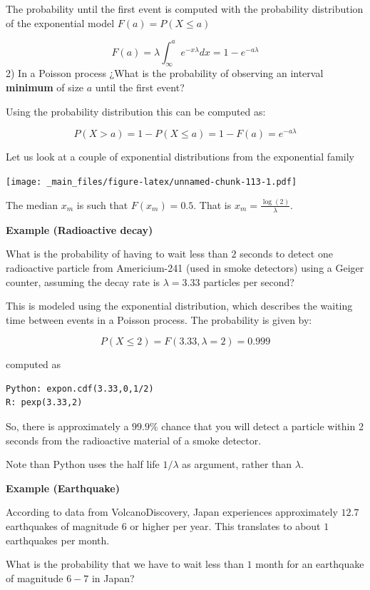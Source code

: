 \documentclass[
]{book}
\begin{document}
The probability until the first event is computed with the probability distribution of the exponential model \(F(a)=P(X \leq a)\)

\[F(a)=\lambda \int_\infty^a e^{-x\lambda}dx=1-e^{-a\lambda}\]
2) In a Poisson process ¿What is the probability of observing an interval \textbf{minimum} of size \(a\) until the first event?

Using the probability distribution this can be computed as:

\[P(X > a)=1- P(X \leq a)= 1- F(a) = e^{-a\lambda}\]

Let us look at a couple of exponential distributions from the exponential family

\texttt{[image: \_main\_files/figure-latex/unnamed-chunk-113-1.pdf]}

The median \(x_m\) is such that \(F(x_m)=0.5\). That is \(x_m=\frac{\log(2)}{\lambda}\).

\textbf{Example (Radioactive decay)}

What is the probability of having to wait less than \(2\) seconds to detect one radioactive particle from Americium-241 (used in smoke detectors) using a Geiger counter, assuming the decay rate is \(\lambda = 3.33\) particles per second?

This is modeled using the exponential distribution, which describes the waiting time between events in a Poisson process. The probability is given by:

\[P(X \le 2)=F(3.33,\lambda=2)=0.999\]

computed as

\begin{verbatim}
Python: expon.cdf(3.33,0,1/2)
R: pexp(3.33,2)
\end{verbatim}

So, there is approximately a \(99.9\%\) chance that you will detect a particle within 2 seconds from the radioactive material of a smoke detector.

Note than Python uses the half life \(1/\lambda\) as argument, rather than \(\lambda\).

\textbf{Example (Earthquake)}

According to data from VolcanoDiscovery, Japan experiences approximately \(12.7\) earthquakes of magnitude \(6\) or higher per year. This translates to about \(1\) earthquakes per month.

What is the probability that we have to wait less than \(1\) month for an earthquake of magnitude \(6-7\) in Japan?
\end{document}
